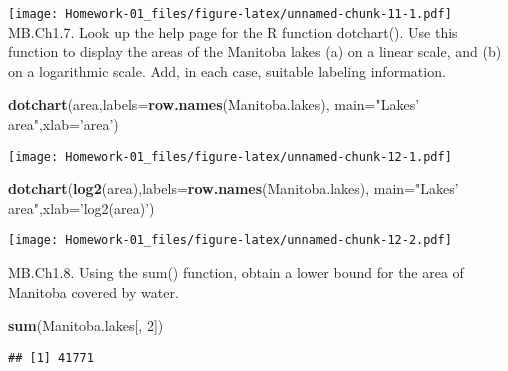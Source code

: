 \documentclass[
]{article}
\newenvironment{Shaded}{\begin{snugshade}}{\end{snugshade}}
\newcommand{\DataTypeTok}[1]{\textcolor[rgb]{0.13,0.29,0.53}{#1}}
\newcommand{\DecValTok}[1]{\textcolor[rgb]{0.00,0.00,0.81}{#1}}
\newcommand{\KeywordTok}[1]{\textcolor[rgb]{0.13,0.29,0.53}{\textbf{#1}}}
\newcommand{\NormalTok}[1]{#1}
\newcommand{\StringTok}[1]{\textcolor[rgb]{0.31,0.60,0.02}{#1}}
\begin{document}
\texttt{[image: Homework-01\_files/figure-latex/unnamed-chunk-11-1.pdf]}
MB.Ch1.7. Look up the help page for the R function dotchart(). Use this
function to display the areas of the Manitoba lakes (a) on a linear
scale, and (b) on a logarithmic scale. Add, in each case, suitable
labeling information.

\begin{Shaded}
\begin{Highlighting}[]
\KeywordTok{dotchart}\NormalTok{(area,}\DataTypeTok{labels=}\KeywordTok{row.names}\NormalTok{(Manitoba.lakes), }\DataTypeTok{main=}\StringTok{"Lakes' area"}\NormalTok{,}\DataTypeTok{xlab=}\StringTok{'area'}\NormalTok{)}
\end{Highlighting}
\end{Shaded}

\texttt{[image: Homework-01\_files/figure-latex/unnamed-chunk-12-1.pdf]}

\begin{Shaded}
\begin{Highlighting}[]
\KeywordTok{dotchart}\NormalTok{(}\KeywordTok{log2}\NormalTok{(area),}\DataTypeTok{labels=}\KeywordTok{row.names}\NormalTok{(Manitoba.lakes), }\DataTypeTok{main=}\StringTok{"Lakes' area"}\NormalTok{,}\DataTypeTok{xlab=}\StringTok{'log2(area)'}\NormalTok{)}
\end{Highlighting}
\end{Shaded}

\texttt{[image: Homework-01\_files/figure-latex/unnamed-chunk-12-2.pdf]}

MB.Ch1.8. Using the sum() function, obtain a lower bound for the area of
Manitoba covered by water.

\begin{Shaded}
\begin{Highlighting}[]
\KeywordTok{sum}\NormalTok{(Manitoba.lakes[, }\DecValTok{2}\NormalTok{])}
\end{Highlighting}
\end{Shaded}

\begin{verbatim}
## [1] 41771
\end{verbatim}
\end{document}
